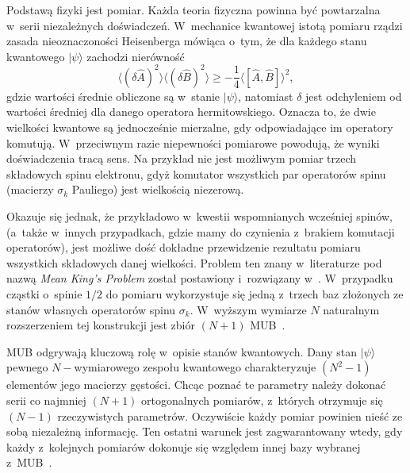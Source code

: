\documentclass[a4paper,12pt,twoside]{article}
\begin{document}
Podstaw\k{a} fizyki jest pomiar. Ka\.{z}da teoria fizyczna powinna by\'{c} powtarzalna w~serii nie\-za\-le\.{z}\-nych do\'{s}wiadcze\'{n}. W~mechanice kwantowej istot\k{a} pomiaru rz\k{a}dzi zasada nieoznaczono\'{s}ci Heisenberga m\'{o}wi\k{a}ca o~tym, \.{z}e dla ka\.{z}dego stanu kwantowego $|\psi\rangle$ zachodzi nier\'{o}wno\'{s}\'{c}
\begin{equation}
\langle(\delta\hat{A})^2\rangle \langle(\delta \hat{B})^2\rangle\geqslant-\frac{1}{4}\langle\left[ \hat{A},\hat{B}\right]\rangle^2,
\end{equation}
gdzie warto\'{s}ci \'{s}rednie obliczone s\k{a} w~stanie $|\psi\rangle$, natomiast $\delta$ jest odchyleniem od warto\'{s}ci \'{s}redniej dla danego operatora hermitowskiego. Oznacza to, \.{z}e dwie wielko\'{s}ci kwantowe s\k{a} jednocze\'{s}nie mierzalne, gdy odpowiadaj\k{a}ce im operatory komutuj\k{a}. W~przeciwnym razie niepewno\'{s}ci pomiarowe powoduj\k{a}, \.{z}e wyniki do\'{s}wiadczenia trac\k{a} sens. Na przyk{\l}ad nie jest mo\.{z}liwym pomiar trzech sk{\l}adowych spinu elektronu, gdy\.{z} komutator wszystkich par operator\'{o}w spinu (macierzy $\sigma_k$ Pauliego) jest wielko\'{s}ci\k{a} niezerow\k{a}.

Okazuje si\k{e} jednak, \.{z}e przyk{\l}adowo w~kwestii wspomnianych wcze\'{s}niej spin\'{o}w, (a~tak\.{z}e w~innych przypadkach, gdzie mamy do czynienia z~brakiem komutacji operator\'{o}w), jest mo\.{z}liwe do\'{s}\'{c} dok{\l}adne przewidzenie rezultatu pomiaru wszystkich sk{\l}adowych danej wielko\'{s}ci. Problem ten znany w~literaturze pod nazw\k{a} \emph{Mean King's Problem} zosta{\l} postawiony i~rozwi\k{a}zany w~\cite{VAA87}. W~przypadku cz\k{a}stki o~spinie $1/2$ do pomiaru wykorzystuje si\k{e} jedn\k{a} z~trzech baz z{\l}o\.{z}onych ze stan\'{o}w w{\l}asnych operator\'{o}w spinu $\sigma_k$. W~wy\.{z}szym wymiarze $N$ naturalnym rozszerzeniem tej konstrukcji jest zbi\'{o}r $(N+1)$ MUB~\cite{EA01}.

MUB odgrywaj\k{a} kluczow\k{a} rol\k{e} w~opisie stan\'{o}w kwantowych. Dany stan $|\psi\rangle$ pewnego $N-$wymiarowego zespo{\l}u kwantowego charakteryzuje $(N^2-1)$ element\'{o}w jego macierzy g\k{e}sto\'{s}ci. Chc\k{a}c pozna\'{c} te parametry nale\.{z}y dokona\'{c} serii co najmniej $(N + 1)$ or\-to\-go\-nal\-nych pomiar\'{o}w, z~kt\'{o}rych otrzymuje si\k{e} $(N-1)$ rzeczywistych parametr\'{o}w. Oczywi\'{s}cie ka\.{z}dy pomiar powinien nie\'{s}\'{c} ze sob\k{a} niezale\.{z}n\k{a} informacj\k{e}. Ten ostatni warunek jest zagwarantowany wtedy, gdy ka\.{z}dy z~kolejnych pomiar\'{o}w dokonuje si\k{e} wzgl\k{e}dem innej bazy wybranej z~MUB~\cite{WF81}.
\end{document}
